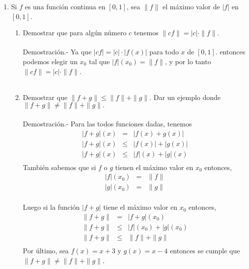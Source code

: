 \begin{enumerate}
\begin{enumerate}[\bfseries (a)]
    \end{enumerate}

\item Si $f$ es una función continua en $[0,1]$, sea $\|f\|$ el máximo valor de $|f|$ en $[0,1]$.

    \begin{enumerate}[\bfseries (a)]

	\item Demostrar que para algún número $c$ tenemos $\|cf\| = |c|\cdot \|f\|$.\\\\
	    Demostración.-\; Ya que $|cf|=|c|\cdot |f(x)|$ para todo $x$ de $[0,1].$ entonces podemos elegir un $x_0$ tal que $|f|(x_0)=\|f\|$, y por lo tanto $\|cf\| = |c|\cdot \|f\|$.\\\\

	\item Demostrar que $\|f+g\|\leq \|f\|+\|g\|.$ Dar un ejemplo donde $\|f+g\|\neq \|f\|+\|g\|.$\\\\
	    Demostración.-\; Para las todos funciones dadas, tenemos
	    $$\begin{array}{rcl}
		|f+g|(x)&=&|f(x)+g(x)|\\
		|f+g|(x)&\leq&|f(x)|+|g(x)|\\
		|f+g|(x)&\leq&|f|(x)+|g|(x)\\
	    \end{array}$$
	    También sabemos que si $f$ o $g$ tienen el máximo valor en $x_0$ entonces,
	    $$\begin{array}{rcl}
		|f|(x_0)&=&\|f\|\\
		|g|(x_0)&=&\|g\|\\
	    \end{array}$$

	    Luego si la función $|f+g|$ tiene el máximo valor en $x_0$ entonces,
	    $$\begin{array}{rcl}
		\|f+g\|&=&|f+g|(x_0)\\
		\|f+g\|&\leq&|f|(x_0) + |g|(x_0)\\
		       \|f+g\|&\leq&\|f\| + \|g\|\\
	    \end{array}$$
	    Por último, sea $f(x)=x+3$ y $g(x)=x-4$ entonces se cumple que $\|f+g\|\neq \|f\|+\|g\|$.\\\\


\end{enumerate}
\end{enumerate}
